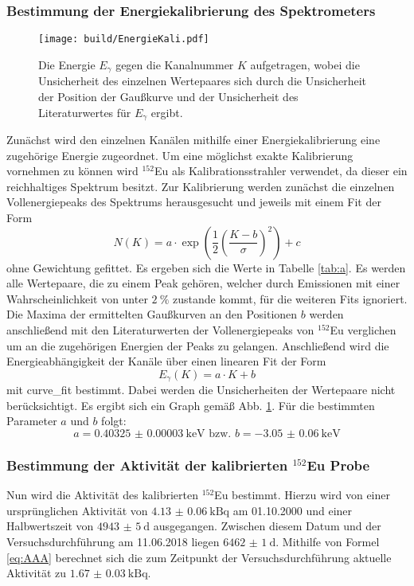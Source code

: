 \subsubsection{Bestimmung der Energiekalibrierung des Spektrometers}
\label{subsec:EnergieKali}
\begin{figure}
	\centering
	\texttt{[image: build/EnergieKali.pdf]}
	\caption{Die Energie $E_\gamma$ gegen die Kanalnummer $K$ aufgetragen, wobei die Unsicherheit des einzelnen Wertepaares sich durch die Unsicherheit der Position der Gaußkurve und der Unsicherheit des Literaturwertes für $E_\gamma$ ergibt.}
	\label{fig:E}
\end{figure}
Zunächst wird den einzelnen Kanälen mithilfe einer Energiekalibrierung eine zugehörige Energie zugeordnet. Um eine möglichst exakte Kalibrierung vornehmen zu können wird $^{152}$Eu als Kalibrationsstrahler verwendet, da dieser ein reichhaltiges Spektrum besitzt. Zur Kalibrierung werden zunächst die einzelnen Vollenergiepeaks des Spektrums herausgesucht und jeweils mit einem Fit der Form
\begin{equation}
    N(K)=a \cdot \exp\left(\frac{1}{2}\left( \frac{K-b}{\sigma}\right)^2\right) +c \label{eq:gaußFit}
\end{equation}
ohne Gewichtung gefittet. Es ergeben sich die Werte in Tabelle \ref{tab:a}. Es werden alle Wertepaare, die zu einem Peak gehören, welcher durch Emissionen mit einer Wahrscheinlichkeit von unter $\SI{2}{\percent}$ zustande kommt, für die weiteren Fits ignoriert. Die Maxima der ermittelten Gaußkurven an den Positionen $b$ werden anschließend mit den Literaturwerten der Vollenergiepeaks von $^{152}$Eu \cite{MARTIN20131497} verglichen um an die zugehörigen Energien der Peaks zu gelangen. Anschließend wird die Energieabhängigkeit der Kanäle über einen linearen Fit der Form 
\begin{equation}
	E_\gamma(K)=a \cdot K+b \label{eq:eKali}
\end{equation}
mit curve\_fit \cite{scipy} bestimmt. Dabei werden die Unsicherheiten der Wertepaare nicht berücksichtigt. Es ergibt sich ein Graph gemäß Abb. \ref{fig:E}. Für die bestimmten Parameter $a$ und $b$ folgt:
\begin{equation}
a = \SI{0.40325(3)}{\kilo\electronvolt} \text{ bzw. } b = \SI{-3.05(6)}{\kilo\electronvolt}
\end{equation}


\subsubsection{Bestimmung der Aktivität der kalibrierten $^{152}$Eu Probe}
Nun wird die Aktivität des kalibrierten $^{152}$Eu bestimmt. Hierzu wird von einer ursprünglichen Aktivität von $\SI{4.13(6)}{\kilo\becquerel}$ am 01.10.2000 und einer Halbwertszeit von $\SI{4943(5)}{\day}$ \cite{V18} ausgegangen. Zwischen diesem Datum und der Versuchsdurchführung am 11.06.2018 liegen $\SI{6462(1)}{\day}$. Mithilfe von Formel \eqref{eq:AAA} berechnet sich die zum Zeitpunkt der Versuchsdurchführung aktuelle Aktivität zu $\SI{1.67(3)}{\kilo\becquerel}$.

